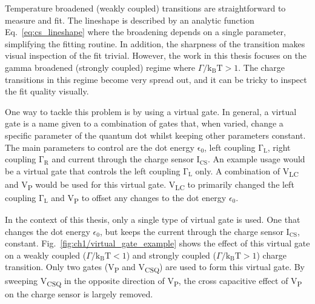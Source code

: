 Temperature broadened (weakly coupled) transitions are straightforward to measure and fit. The lineshape is described by an analytic function Eq.~\ref{eq:cs_lineshape} where the broadening depends on a single parameter, simplifying the fitting routine. In addition, the sharpness of the transition makes visual inspection of the fit trivial. However, the work in this thesis focuses on the gamma broadened (strongly coupled) regime where $\Gamma/\mathrm{k_BT}>1$. The charge transitions in this regime become very spread out, and it can be tricky to inspect the fit quality visually. 

One way to tackle this problem is by using a virtual gate. In general, a virtual gate is a name given to a combination of gates that, when varied, change a specific parameter of the quantum dot whilst keeping other parameters constant. The main parameters to control are the dot energy $\mathrm{\epsilon_0}$, left coupling $\mathrm{\Gamma_L}$, right coupling $\mathrm{\Gamma_R}$ and current through the charge sensor $\mathrm{I_{CS}}$. An example usage would be a virtual gate that controls the left coupling $\mathrm{\Gamma_L}$ only. A combination of V\textsubscript{LC} and V\textsubscript{P} would be used for this virtual gate. V\textsubscript{LC} to primarily changed the left coupling $\mathrm{\Gamma_L}$ and V\textsubscript{P} to offset any changes to the dot energy $\epsilon_0$. 


In the context of this thesis, only a single type of virtual gate is used. One that changes the dot energy $\epsilon_0$, but keeps the current through the charge sensor $\mathrm{I_{CS}}$, constant. Fig.~\ref{fig:ch1/virtual_gate_example} shows the effect of this virtual gate on a weakly coupled ($\Gamma/\mathrm{k_BT}<1$) and strongly coupled ($\Gamma/\mathrm{k_BT}>1$) charge transition. Only two gates (V\textsubscript{P} and V\textsubscript{CSQ}) are used to form this virtual gate. By sweeping V\textsubscript{CSQ} in the opposite direction of V\textsubscript{P}, the cross capacitive effect of V\textsubscript{P} on the charge sensor is largely removed. 











